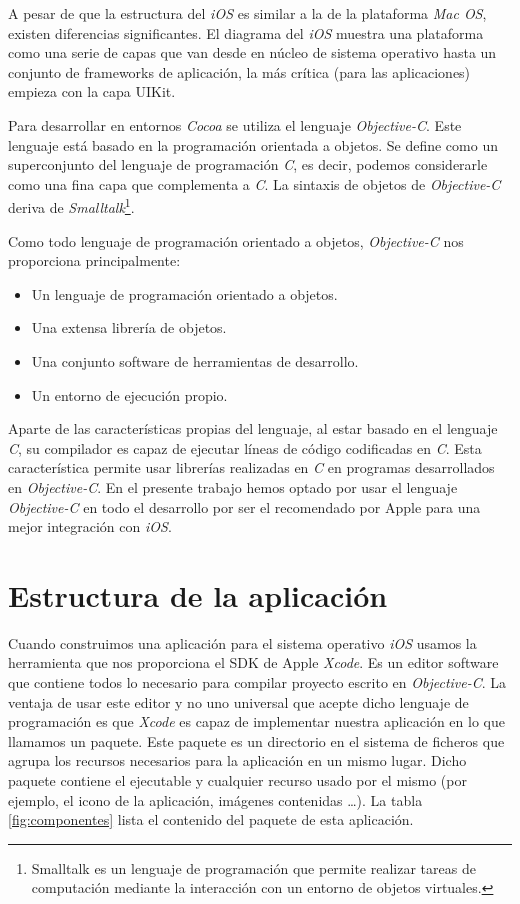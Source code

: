  A pesar de que la estructura del \emph{iOS} es similar a la de la plataforma \emph{Mac OS}, existen diferencias significantes. El diagrama del \emph{iOS} muestra una plataforma como una serie de capas que van desde en núcleo de sistema operativo hasta un conjunto de frameworks de aplicación, la más crítica (para las aplicaciones) empieza con la capa UIKit.
 
 Para desarrollar en entornos \emph{Cocoa} se utiliza el lenguaje \emph{Objective-C}. Este lenguaje está basado en la programación orientada a objetos. Se define como un superconjunto del lenguaje de programación \emph{C}, es decir, podemos considerarle como una fina capa que complementa a \emph{C}. La sintaxis de objetos de \emph{Objective-C} deriva de \emph{Smalltalk}\footnote{Smalltalk es un lenguaje de programación que permite realizar tareas de computación mediante la interacción con un entorno de objetos virtuales.}.
 
  Como todo lenguaje de programación orientado a objetos, \emph{Objective-C} nos proporciona principalmente:
 \begin{itemize}
	\item Un lenguaje de programación orientado a objetos.
	\item Una extensa librería de objetos.
	\item Una conjunto software de herramientas de desarrollo.
	\item Un entorno de ejecución propio.
\end{itemize}

 Aparte de las características propias del lenguaje, al estar basado en el lenguaje \emph{C}, su compilador es capaz de ejecutar líneas de código codificadas en \emph{C}. Esta característica permite usar librerías realizadas en \emph{C} en programas desarrollados en \emph{Objective-C}.  En el presente trabajo hemos optado por usar el lenguaje \emph{Objective-C} en todo el desarrollo por ser el recomendado por Apple para una mejor integración con \emph{iOS}.
 
\section{Estructura de la aplicación}
 Cuando construimos una aplicación para el sistema operativo \emph{iOS} usamos la herramienta que nos proporciona el SDK de Apple \emph{Xcode}. Es un editor software que contiene todos lo necesario para compilar proyecto escrito en \emph{Objective-C}. La ventaja de usar este editor y no uno universal que acepte dicho lenguaje de programación es que \emph{Xcode} es capaz de implementar nuestra aplicación en lo que llamamos un paquete. Este paquete es un directorio en el sistema de ficheros que agrupa los recursos necesarios para la aplicación en un mismo lugar. Dicho paquete contiene el ejecutable y cualquier recurso usado por el mismo (por ejemplo, el icono de la aplicación, imágenes contenidas \ldots). La tabla \ref{fig:componentes} lista el contenido del paquete de esta aplicación.
 
